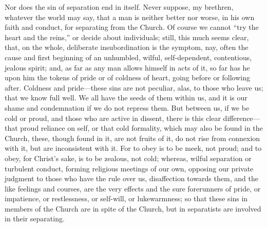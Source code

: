 Nor does the sin of separation end in itself. Never suppose, my
brethren, whatever the world may say, that a man is neither better nor
worse, in his own faith and conduct, for separating from the Church.
Of course we cannot ``try the heart and the reins,'' or decide
about individuals; still, this much seems clear, that, on the whole,
deliberate insubordination is the symptom, nay, often the cause and
first beginning of an unhumbled, wilful, self-dependent, contentious,
jealous spirit; and, as far as any man allows himself in acts of it,
so far has he upon him the tokens of pride or of coldness of heart,
going before or following after. Coldness and pride—these sins are
not peculiar, alas, to those who leave us; that we know full well. We
all have the seeds of them within us, and it is our shame and
condemnation if we do not repress them. But between us, if we be cold
or proud, and those who are active in dissent, there is this clear
difference—that proud reliance on self, or that cold formality,
which may also be found in the Church, these, though found in it, are
not fruits of it, do not rise from connexion with it, but are
inconsistent with it. For to obey is to be meek, not proud; and to
obey, for Christ's sake, is to be zealous, not cold; whereas, wilful
separation or turbulent conduct, forming religious meetings of our
own, opposing our private judgment to those who have the rule over us,
disaffection towards them, and the like feelings and courses, are the
very effects and the sure forerunners of pride, or impatience, or
restlessness, or self-will, or lukewarmness; so that these sins in
members of the Church are in spite of the Church, but in separatists
are involved in their separating.

